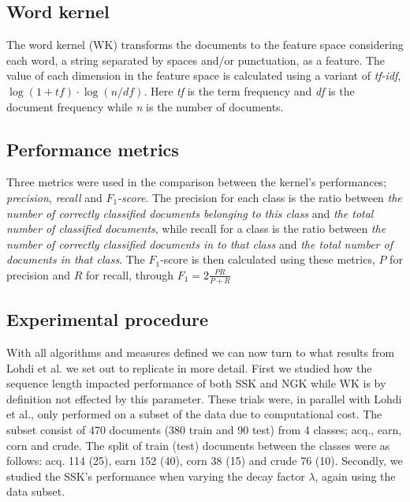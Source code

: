 
\subsection{Word kernel}
The word kernel (WK) transforms the documents to the feature space considering each word, a string separated by spaces and/or punctuation, as a feature. The value of each dimension in the feature space is calculated using a variant of \textit{tf-idf}, $ \log(1+tf) \cdot \log(n/df) $. Here \textit{tf} is the term frequency and \textit{df} is the document frequency while \textit{n} is the number of documents. 


\subsection{Performance metrics}
Three metrics were used in the comparison between the kernel's performances; \textit{precision}, \textit{recall} and \textit{$ F_1 $-score}. The precision for each class is the ratio between \textit{the number of correctly classified documents belonging to this class} and \textit{the total number of classified documents}, while recall for a class is the ratio between \textit{the number of correctly classified documents in to that class} and \textit{the total number of documents in that class}. The $ F_1 $-score is then calculated using these metrics, $ P $ for precision and $ R $ for recall, through $F_1 = 2\frac{PR}{P+R}$


\subsection{Experimental procedure}
With all algorithms and measures defined we can now turn to what results from Lohdi et al. we set out to replicate in more detail. First we studied how the sequence length impacted performance of both SSK and NGK while WK is by definition not effected by this parameter. These trials were, in parallel with Lohdi et al., only performed on a subset of the data due to computational cost. The subset consist of 470 documents (380 train and 90 test) from  4 classes; acq., earn, corn and crude. The split of train (test) documents between the classes were as follows: acq. 114 (25), earn 152 (40), corn 38 (15) and crude 76 (10). Secondly, we studied the SSK's performance when varying the decay factor $ \lambda $, again using the data subset. %

